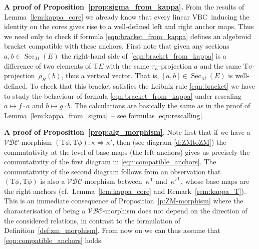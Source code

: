 \documentclass[10pt,a4paper]{amsart}
\newcommand{\ZM}{{VBC}} %
\newcommand{\Sec}{\operatorname{Sec}}
\newcommand{\mZM}{\Rightarrow}
\newcommand{\rhoR}{\rho_R}
\newcommand{\T}{\mathrm{T}} %
\newcommand{\catZM}{{\mathcal{VBC}}} %
\numberwithin{equation}{section}
\theoremstyle{definition}
\begin{document}
{\bf A proof of Proposition~\ref{prop:sigma_from_kappa}.} %
From the results of Lemma~\ref{lem:kappa_core} we already know that every linear \ZM\ inducing the identity on the cores gives rise to a well-defined left and right anchor maps. Thus we need only to check if formula \eqref{eqn:bracket_from_kappa} defines an algebroid bracket compatible with these anchors. First note that given any sections $a,b\in \Sec_M(E)$ the right-hand side of~\eqref{eqn:bracket_from_kappa} is a difference of two elements of $\T E$ with the same $\tau_E$-projection $a$ and the same $\T\sigma$-projection~$\rhoR(b)$, thus a vertical vector. That is, $[a,b]\in\Sec_M(E)$ is well-defined. To check that this bracket satisfies the Leibniz rule \eqref{eqn:bracket} we have to study the behaviour of formula \eqref{eqn:bracket_from_kappa} under rescaling $a\mapsto f\cdot a$ and $b\mapsto g\cdot b$. The calculations are basically the same as in the proof of Lemma~\ref{lem:kappa_from_sigma}~-- see formulas \eqref{eqn:rescalling}. %

{\bf A proof of Proposition~\ref{prop:alg_morphism}.} %
Note first that if we have a $\catZM$-morphism \mbox{$(\T \phi,\T\phi)\colon \kappa\mZM\kappa'$}, then (see diagram \eqref{d:ZMtoZM}) the commutativity at the level of base maps (the left anchors) gives us precisely the commutativity of the first diagram in \eqref{eqn:compatible_anchors}. The commutativity of the se\-cond diagram follows from an observation that $(\T \phi,\T\phi)$ is also a $\catZM$-morphism between~$\kappa^\T$ and~${\kappa'}^\T$, whose base maps are the right anchors (cf.\ Lemma~\ref{lem:kappa_core} and Remark~\ref{rem:kappa_T}). This is an immediate consequence of Proposition~\ref{p:ZM-morphism} where the characterisation of being a $\catZM$-morphism does not depend on the direction of the considered relations, in contrast to the formulation of Definition~\ref{def:zm_morphism}. From now on we can thus assume that \eqref{eqn:compatible_anchors} holds.
\end{document}
